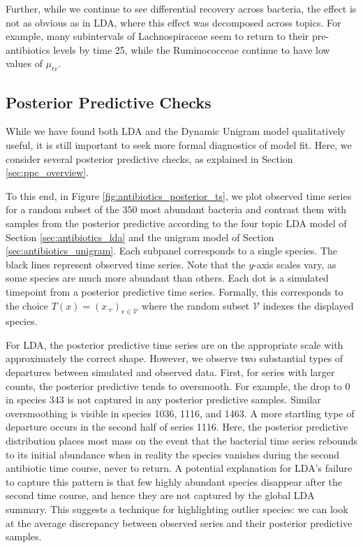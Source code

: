 \documentclass[oupdraft]{bio}
\begin{document}
Further, while we continue to see differential recovery across bacteria, the
effect is not as obvious as in LDA, where this effect was decomposed across
topics. For example, many subintervals of Lachnospiraceae seem to return to
their pre-antibiotics levels by time 25, while the Ruminococceae continue to
have low values of $\mu_{tv}$.

\subsection{Posterior Predictive Checks}
\label{sec:antibiotics_ppc}

While we have found both LDA and the Dynamic Unigram model qualitatively useful,
it is still important to seek more formal diagnostics of model fit. Here, we
consider several posterior predictive checks, as explained in Section
\ref{sec:ppc_overview}.

To this end, in Figure \ref{fig:antibiotics_posterior_ts}, we plot observed time
series for a random subset of the 350 most abundant bacteria and contrast them
with samples from the posterior predictive according to the four topic LDA model
of Section \ref{sec:antibiotics_lda} and the unigram model of Section
\ref{sec:antibiotics_unigram}. Each subpanel corresponds to a single species. The
black lines represent observed time series. Note that the $y$-axis scales vary,
as some species are much more abundant than others. Each dot is a simulated
timepoint from a posterior predictive time series. Formally, this corresponds to
the choice $T\left(x\right) = \left(x_{\cdot v}\right)_{v \in \mathcal{V}}$
where the random subset $\mathcal{V}$ indexes the displayed species.

For LDA, the posterior predictive time series are on the appropriate scale with
approximately the correct shape. However, we observe two substantial types of
departures between simulated and observed data. First, for series with larger
counts, the posterior predictive tends to oversmooth. For example, the drop to 0
in species 343 is not captured in any posterior predictive samples. Similar
oversmoothing is visible in species 1036, 1116, and 1463. A more startling type of
departure occurs in the second half of series 1116. Here, the posterior
predictive distribution places most mass on the event that the bacterial time
series rebounds to its initial abundance when in reality the species vanishes
during the second antibiotic time course, never to return. A potential
explanation for LDA's failure to capture this pattern is that few highly
abundant species disappear after the second time course, and hence they are not
captured by the global LDA summary. This suggests a technique for highlighting
outlier species: we can look at the average discrepancy between observed series
and their posterior predictive samples.
\end{document}

